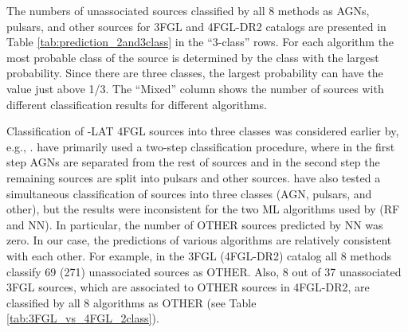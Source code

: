 The numbers of unassociated sources classified by all 8 methods as AGNs, pulsars, and other sources for 3FGL and 4FGL-DR2 catalogs are presented in Table \ref{tab:prediction_2and3class} in the ``3-class'' rows.
For each algorithm the most probable class of the source is determined by the class with the largest probability.
Since there are three classes, the largest probability can have the value just above 1/3.
The ``Mixed'' column shows the number of sources with different classification results for different algorithms.


Classification of \Fermi-LAT 4FGL sources into three classes was considered earlier by, e.g., \cite{2021RAA....21...15Z}.
\cite{2021RAA....21...15Z} have primarily used a two-step classification procedure, where in the first step AGNs are separated from the rest of sources and in the second step the remaining sources are split into pulsars and other sources.
\cite{2021RAA....21...15Z} have also tested a simultaneous classification of sources into three classes (AGN, pulsars, and other),
but the results were inconsistent for the two ML algorithms used by \cite{2021RAA....21...15Z} (RF and NN).
In particular, the number of OTHER sources predicted by NN was zero.
In our case, the predictions of various algorithms are relatively consistent with each other.
For example, in the 3FGL (4FGL-DR2) catalog all 8 methods classify 69 (271) unassociated sources as OTHER.
Also, 8 out of 37 unassociated 3FGL sources, which are associated to OTHER sources in 4FGL-DR2, are classified by all 8 algorithms as
OTHER (see Table \ref{tab:3FGL_vs_4FGL_2class}).

